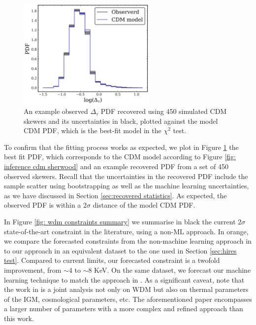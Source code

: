 \begin{figure}
    \centering
    \includegraphics[width=0.6\textwidth]{img/ML/pdf_model_observed.png}
    \caption{An example observed $\Delta_\tau$ PDF recovered using 450 simulated CDM skewers and its uncertainties in black, plotted against the model CDM PDF, which is the best-fit model in the $\chi^2$ test. }
    \label{fig: inference cdm PDF}
\end{figure}

To confirm that the fitting process works as expected, we plot in Figure \ref{fig: inference cdm PDF} the best fit PDF, which corresponds to the CDM model according to Figure \ref{fig: inference cdm sherwood} and an example recovered PDF from a set of 450 observed skewers. Recall that the uncertainties in the recovered PDF include the sample scatter using bootstrapping as well as the machine learning uncertainties, as we have discussed in Section \ref{sec:recovered statistics}. As expected, the observed PDF is within a $2\sigma$ distance of the model CDM PDF.

In Figure \ref{fig: wdm constraints summary} we summarise in black the current $2\sigma$ state-of-the-art constraint in the literature, using a non-ML approach. In orange, we compare the forecasted constraints from the non-machine learning approach in \cite{sherwood_wdm} to our approach in an equivalent dataset to the one used in Section \ref{sec:hires test}. Compared to current limits, our forecasted constraint is a twofold improvement, from $\sim 4$ to $\sim 8$ KeV. On the same dataset, we forecast our machine learning technique to match the approach in \cite{sherwood_wdm}. As a significant caveat, note that the work in \cite{sherwood_wdm} is a joint analysis not only on WDM but also on thermal parameters of the IGM, cosmological parameters, etc. The aforementioned paper encompasses a larger number of parameters with a more complex and refined approach than this work.


